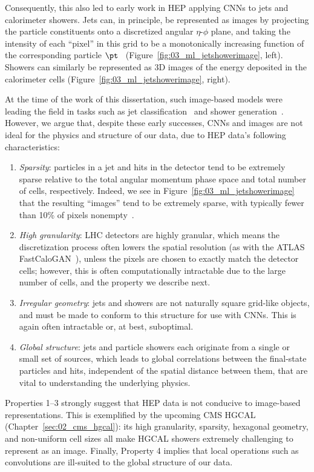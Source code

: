 Consequently, this also led to early work in HEP applying CNNs to jets and calorimeter showers.
Jets can, in principle, be represented as images by projecting the particle constituents onto a discretized angular $\eta$-$\phi$ plane, and taking the intensity of each ``pixel'' in this grid to be a monotonically increasing function of the corresponding particle $\pt$~\cite{deOliveira:2015xxd} (Figure~\ref{fig:03_ml_jetshowerimage}, left).
Showers can similarly be represented as 3D images of the energy deposited in the calorimeter cells (Figure~\ref{fig:03_ml_jetshowerimage}, right).

At the time of the work of this dissertation, such image-based models were leading the field in tasks such as jet classification~\cite{CMS:2020poo} and shower generation~\cite{ATL-SOFT-PUB-2018-001}.
However, we argue that, despite these early successes, CNNs and images are not ideal for the physics and structure of our data, due to HEP data's following characteristics:
\begin{enumerate}
    \item \textit{Sparsity}: particles in a jet and hits in the detector tend to be extremely sparse relative to the total angular momentum phase space and total number of cells, respectively.
    Indeed, we see in Figure~\ref{fig:03_ml_jetshowerimage} that the resulting ``images'' tend to be extremely sparse, with typically fewer than 10\% of pixels nonempty~\cite{Qu:2019gqs}.
    \item \textit{High granularity}: LHC detectors are highly granular, which means the discretization process often lowers the spatial resolution (as with the ATLAS FastCaloGAN~\cite{ATL-SOFT-PUB-2018-001}), unless the pixels are chosen to exactly match the detector cells; however, this is often computationally intractable due to the large number of cells, and the property we describe next.
    \item \textit{Irregular geometry}: jets and showers are not naturally square grid-like objects, and must be made to conform to this structure for use with CNNs.
    This is again often intractable or, at best, suboptimal.
    \item \textit{Global structure}: jets and particle showers each originate from a single or small set of sources, which leads to global correlations between the final-state particles and hits, independent of the spatial distance between them, that are vital to understanding the underlying physics.
\end{enumerate}
Properties 1--3 strongly suggest that HEP data is not conducive to image-based representations.
This is exemplified by the upcoming CMS HGCAL (Chapter~\ref{sec:02_cms_hgcal}): its high granularity, sparsity, hexagonal geometry, and non-uniform cell sizes all make HGCAL showers extremely challenging to represent as an image.
Finally, Property 4 implies that local operations such as convolutions are ill-suited to the global structure of our data.

